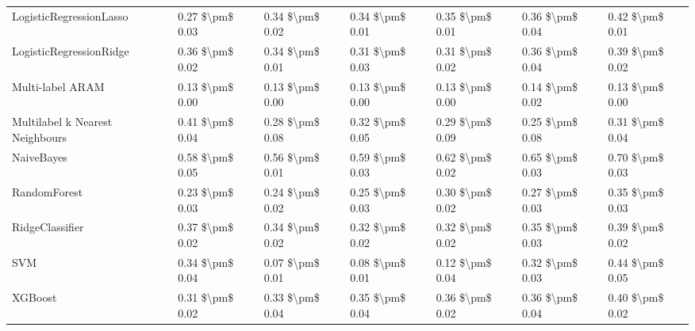 \begin{tabular}{lllllll}
LogisticRegressionLasso         &  0.27 \$\textbackslash pm\$ 0.03 &           0.34 \$\textbackslash pm\$ 0.02 &       0.34 \$\textbackslash pm\$ 0.01 &        0.35 \$\textbackslash pm\$ 0.01 &                         0.36 \$\textbackslash pm\$ 0.04 &  0.42 \$\textbackslash pm\$ 0.01 \\
LogisticRegressionRidge         &  0.36 \$\textbackslash pm\$ 0.02 &           0.34 \$\textbackslash pm\$ 0.01 &       0.31 \$\textbackslash pm\$ 0.03 &        0.31 \$\textbackslash pm\$ 0.02 &                         0.36 \$\textbackslash pm\$ 0.04 &  0.39 \$\textbackslash pm\$ 0.02 \\
Multi-label ARAM                &  0.13 \$\textbackslash pm\$ 0.00 &           0.13 \$\textbackslash pm\$ 0.00 &       0.13 \$\textbackslash pm\$ 0.00 &        0.13 \$\textbackslash pm\$ 0.00 &                         0.14 \$\textbackslash pm\$ 0.02 &  0.13 \$\textbackslash pm\$ 0.00 \\
Multilabel k Nearest Neighbours &  0.41 \$\textbackslash pm\$ 0.04 &           0.28 \$\textbackslash pm\$ 0.08 &       0.32 \$\textbackslash pm\$ 0.05 &        0.29 \$\textbackslash pm\$ 0.09 &                         0.25 \$\textbackslash pm\$ 0.08 &  0.31 \$\textbackslash pm\$ 0.04 \\
NaiveBayes                      &  0.58 \$\textbackslash pm\$ 0.05 &           0.56 \$\textbackslash pm\$ 0.01 &       0.59 \$\textbackslash pm\$ 0.03 &        0.62 \$\textbackslash pm\$ 0.02 &                         0.65 \$\textbackslash pm\$ 0.03 &  0.70 \$\textbackslash pm\$ 0.03 \\
RandomForest                    &  0.23 \$\textbackslash pm\$ 0.03 &           0.24 \$\textbackslash pm\$ 0.02 &       0.25 \$\textbackslash pm\$ 0.03 &        0.30 \$\textbackslash pm\$ 0.02 &                         0.27 \$\textbackslash pm\$ 0.03 &  0.35 \$\textbackslash pm\$ 0.03 \\
RidgeClassifier                 &  0.37 \$\textbackslash pm\$ 0.02 &           0.34 \$\textbackslash pm\$ 0.02 &       0.32 \$\textbackslash pm\$ 0.02 &        0.32 \$\textbackslash pm\$ 0.02 &                         0.35 \$\textbackslash pm\$ 0.03 &  0.39 \$\textbackslash pm\$ 0.02 \\
SVM                             &  0.34 \$\textbackslash pm\$ 0.04 &           0.07 \$\textbackslash pm\$ 0.01 &       0.08 \$\textbackslash pm\$ 0.01 &        0.12 \$\textbackslash pm\$ 0.04 &                         0.32 \$\textbackslash pm\$ 0.03 &  0.44 \$\textbackslash pm\$ 0.05 \\
XGBoost                         &  0.31 \$\textbackslash pm\$ 0.02 &           0.33 \$\textbackslash pm\$ 0.04 &       0.35 \$\textbackslash pm\$ 0.04 &        0.36 \$\textbackslash pm\$ 0.02 &                         0.36 \$\textbackslash pm\$ 0.04 &  0.40 \$\textbackslash pm\$ 0.02 \\
\bottomrule
\end{tabular}
